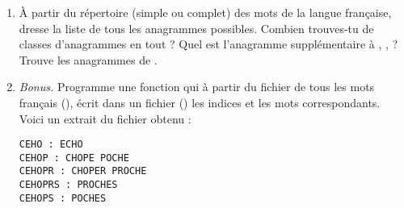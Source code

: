 \documentclass[11pt,class=report,crop=false]{standalone}
\begin{document}
\begin{activite}[Anagrammes]
\begin{enumerate}
  \emph{Méthode.}
  \begin{itemize}
    \item Partir d'un dictionnaire vide .
    \item Pour chaque mot de la liste :
      \begin{itemize}
        \item calculer l'indice du mot,
        \item si cet indice n'existe pas déjà dans le dictionnaire, alors ajouter une nouvelle entrée  : ,
        \item si l'indice existe déjà, alors ajouter le mot à la liste existante :
        .
       \end{itemize} 
  \end{itemize}  
  
  \item \`A partir du répertoire (simple ou complet) des mots de la langue française, dresse la liste de tous les anagrammes possibles. Combien trouves-tu de classes d'anagrammes en tout ? Quel est l'anagramme supplémentaire à , ,  ? Trouve les anagrammes de .
  
  \item \emph{Bonus.} Programme une fonction  qui 
  à partir du fichier de tous les mots français (), écrit dans un fichier () les indices et les mots correspondants. Voici un extrait du fichier obtenu :
\begin{lstlisting}
CEHO : ECHO 
CEHOP : CHOPE POCHE 
CEHOPR : CHOPER PROCHE 
CEHOPRS : PROCHES 
CEHOPS : POCHES
\end{lstlisting}

\end{enumerate}

\end{activite}


\end{document}
